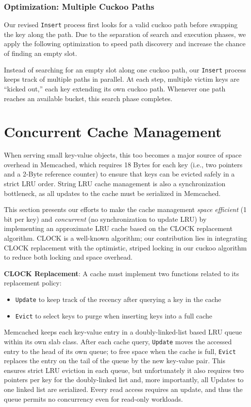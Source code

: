 \documentclass[11pt]{article}
\begin{document}
\subsubsection{Optimization: Multiple Cuckoo Paths}
\label{sec:orgbe0927d}
Our revised \texttt{Insert} process first looks for a valid cuckoo path before swapping the key along the path.
Due to the separation of search and execution phases, we apply the following optimization to speed
path discovery and increase the chance of finding an empty slot.

Instead of searching for an empty slot along one cuckoo path, our \texttt{Insert} process keeps track of
multiple paths in parallel. At each step, multiple victim keys are “kicked out,” each key extending
its own cuckoo path. Whenever one path reaches an available bucket, this search phase completes.
\section{Concurrent Cache Management}
\label{sec:org2102f5e}
When serving small key-value objects, this too becomes a major source of space overhead in Memcached,
which requires 18 Bytes for each key (i.e., two pointers and a 2-Byte reference counter) to ensure
that keys can be evicted safely in a strict LRU order. String LRU cache management is also a
synchronization bottleneck, as all updates to the cache must be serialized in Memcached.

This section presents our efforts to make the cache management \emph{space efficient} (1 bit per key) and
\emph{concurrent} (no synchronization to update LRU) by implementing an approximate LRU cache based on the
CLOCK replacement algorithm. CLOCK is a well-known algorithm; our contribution lies in integrating
CLOCK replacement with the optimistic, striped locking in our cuckoo algorithm to reduce both locking
and space overhead.

\textbf{CLOCK Replacement}: A cache must implement two functions related to its replacement policy:
\begin{itemize}
\item \texttt{Update} to keep track of the recency after querying a key in the cache
\item \texttt{Evict} to select keys to purge when inserting keys into a full cache
\end{itemize}

Memcached keeps each key-value entry in a doubly-linked-list based LRU queue within its own slab
class. After each cache query, \texttt{Update} moves the accessed entry to the head of its own queue; to free
space when the cache is full, \texttt{Evict} replaces the entry on the tail of the queue by the new key-value
pair. This ensures strict LRU eviction in each queue, but unfortunately it also requires two pointers
per key for the doubly-linked list and, more importantly, all Updates to one linked list are
serialized. Every read access requires an update, and thus the queue permits no concurrency even for
read-only workloads.
\end{document}
